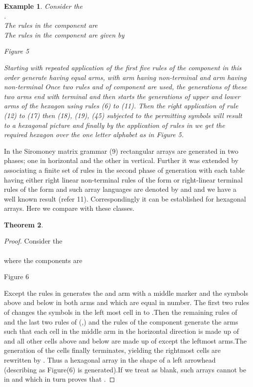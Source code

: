 \documentclass[11pt]{article}
\newtheorem{theorem}{Theorem}[section]
\newtheorem{example}[theorem]{Example}
\begin{document}
\begin{example}Consider the \\
.\\
 The rules in the component  are\\


 

The rules in the component  are given by



\centerline{Figure 5} Starting with  repeated application of
the first five rules of the component  in this order generate
 having equal arms, with  arm having non-terminal  and
 arm having non-terminal  Once two rules  and  of component 
are used, the generations of these two arms end with terminal 
and then starts the generations of upper and lower arms of the
hexagon using rules (6) to (11). Then the right application of
rule (12) to (17) then (18), (19),  (45) subjected to the
permitting symbols will result to a hexagonal picture and finally
by the application of rules in  we get the required hexagon
over the one letter alphabet  as in Figure 5.
\end{example}
 \par In the Siromoney matrix grammar (9) rectangular arrays are generated in
two phases; one in horizontal and the other in vertical. Further
it was extended by associating a finite set of rules in the second
phase of generation with each table having either right linear
non-terminal rules of the form  or right-linear
terminal rules of the form  and such array
languages are denoted by  and  and we have a well
known result 
(refer 11). Correspondingly it can be established for hexagonal
arrays. Here we compare  with these classes.
\begin{theorem}
\end{theorem}
\begin{proof}
Consider the 
\\
\\
where the components are\\




\centerline{Figure 6} Except the rules  in  generates the  and  arm
 with a middle marker  and the symbols  above and below  in both arms and which are equal in number.
 The first two rules of  changes the symbols in the left most cell in to .Then the remaining rules of 
 and the last two rules of  (,) and the rules of the component 
 generate the arms such that each cell in the middle arm in the horizontal direction is made up of  and all other
 cells above and below are made up of  except the leftmost arms.The generation of the cells finally terminates,
 yielding the rightmost cells are rewritten by . Thus a hexagonal array in the shape of a left arrowhead
 (describing as Figure(6) is generated).If we treat  as blank, such arrays cannot be in  and
 which in turn proves that .
 \end{proof}
\end{document}
